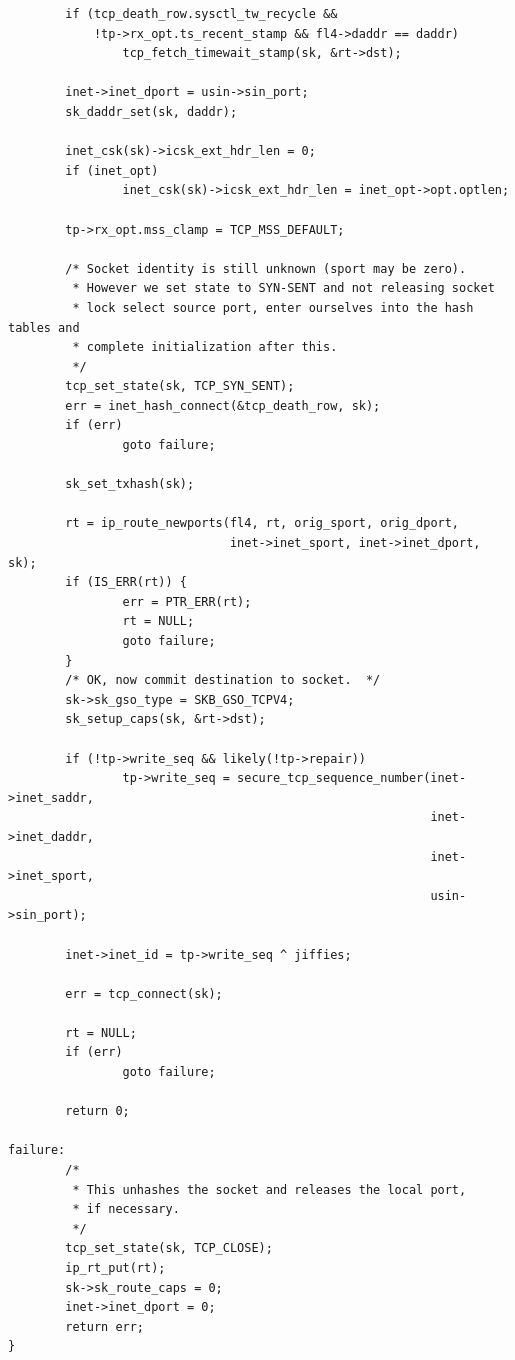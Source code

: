 \documentclass[11pt, a4paper,oneside]{book}
\theoremstyle{ocrenumbox}
\theoremstyle{purplenumbox}
\theoremstyle{blackbox}
\begin{document}
\begin{verbatim}
        if (tcp_death_row.sysctl_tw_recycle &&
            !tp->rx_opt.ts_recent_stamp && fl4->daddr == daddr)
                tcp_fetch_timewait_stamp(sk, &rt->dst);

        inet->inet_dport = usin->sin_port;
        sk_daddr_set(sk, daddr);

        inet_csk(sk)->icsk_ext_hdr_len = 0;
        if (inet_opt)
                inet_csk(sk)->icsk_ext_hdr_len = inet_opt->opt.optlen;

        tp->rx_opt.mss_clamp = TCP_MSS_DEFAULT;

        /* Socket identity is still unknown (sport may be zero).
         * However we set state to SYN-SENT and not releasing socket
         * lock select source port, enter ourselves into the hash tables and
         * complete initialization after this.
         */
        tcp_set_state(sk, TCP_SYN_SENT);
        err = inet_hash_connect(&tcp_death_row, sk);
        if (err)
                goto failure;

        sk_set_txhash(sk);

        rt = ip_route_newports(fl4, rt, orig_sport, orig_dport,
                               inet->inet_sport, inet->inet_dport, sk);
        if (IS_ERR(rt)) {
                err = PTR_ERR(rt);
                rt = NULL;
                goto failure;
        }
        /* OK, now commit destination to socket.  */
        sk->sk_gso_type = SKB_GSO_TCPV4;
        sk_setup_caps(sk, &rt->dst);

        if (!tp->write_seq && likely(!tp->repair))
                tp->write_seq = secure_tcp_sequence_number(inet->inet_saddr,
                                                           inet->inet_daddr,
                                                           inet->inet_sport,
                                                           usin->sin_port);

        inet->inet_id = tp->write_seq ^ jiffies;

        err = tcp_connect(sk);

        rt = NULL;
        if (err)
                goto failure;

        return 0;

failure:
        /*
         * This unhashes the socket and releases the local port,
         * if necessary.
         */
        tcp_set_state(sk, TCP_CLOSE);
        ip_rt_put(rt);
        sk->sk_route_caps = 0;
        inet->inet_dport = 0;
        return err;
}
\end{verbatim}
\end{document}
